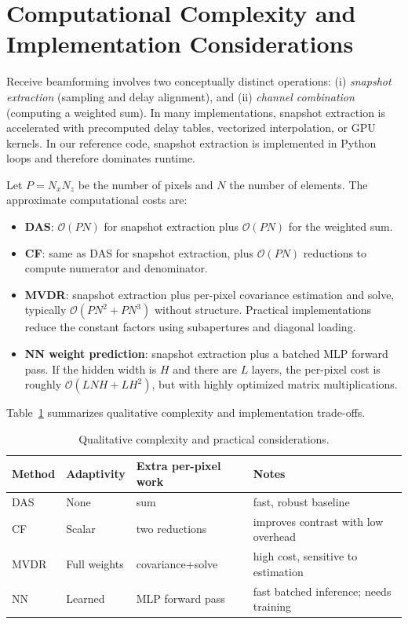 \documentclass[conference]{IEEEtran}
\begin{document}
\section{Computational Complexity and Implementation Considerations}
Receive beamforming involves two conceptually distinct operations:
(i) \emph{snapshot extraction} (sampling and delay alignment), and (ii) \emph{channel combination} (computing a weighted sum).
In many implementations, snapshot extraction is accelerated with precomputed delay tables, vectorized interpolation, or GPU kernels.
In our reference code, snapshot extraction is implemented in Python loops and therefore dominates runtime.

Let $P=N_xN_z$ be the number of pixels and $N$ the number of elements.
The approximate computational costs are:
\begin{itemize}
    \item \textbf{DAS}: $\mathcal{O}(PN)$ for snapshot extraction plus $\mathcal{O}(PN)$ for the weighted sum.
    \item \textbf{CF}: same as DAS for snapshot extraction, plus $\mathcal{O}(PN)$ reductions to compute numerator and denominator.
    \item \textbf{MVDR}: snapshot extraction plus per-pixel covariance estimation and solve, typically $\mathcal{O}(PN^2 + PN^3)$ without structure. Practical implementations reduce the constant factors using subapertures and diagonal loading.
    \item \textbf{NN weight prediction}: snapshot extraction plus a batched MLP forward pass. If the hidden width is $H$ and there are $L$ layers, the per-pixel cost is roughly $\mathcal{O}(LNH + LH^2)$, but with highly optimized matrix multiplications.
\end{itemize}

Table~\ref{tab:complexity} summarizes qualitative complexity and implementation trade-offs.

\begin{table}[t]
\centering
\caption{Qualitative complexity and practical considerations.}
\label{tab:complexity}
\begin{tabular}{llll}
\toprule
Method & Adaptivity & Extra per-pixel work & Notes \\
\midrule
DAS & None & sum & fast, robust baseline \\
CF & Scalar & two reductions & improves contrast with low overhead \\
MVDR & Full weights & covariance+solve & high cost, sensitive to estimation \\
NN & Learned & MLP forward pass & fast batched inference; needs training \\
\bottomrule
\end{tabular}
\end{table}
\end{document}
